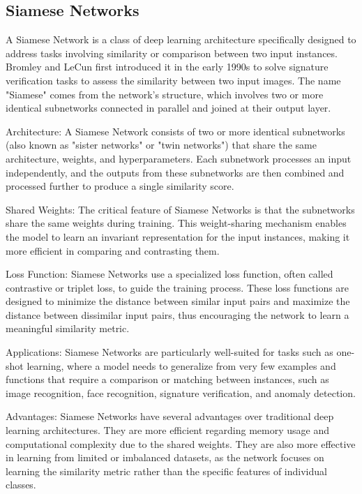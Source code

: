 \subsection{Siamese Networks}

A Siamese Network is a class of deep learning architecture specifically designed to address tasks involving similarity or comparison between two input instances. Bromley and LeCun first introduced it in the early 1990s to solve signature verification tasks to assess the similarity between two input images. The name "Siamese" comes from the network's structure, which involves two or more identical subnetworks connected in parallel and joined at their output layer.

Architecture: A Siamese Network consists of two or more identical subnetworks (also known as "sister networks" or "twin networks") that share the same architecture, weights, and hyperparameters. Each subnetwork processes an input independently, and the outputs from these subnetworks are then combined and processed further to produce a single similarity score.

Shared Weights: The critical feature of Siamese Networks is that the subnetworks share the same weights during training. This weight-sharing mechanism enables the model to learn an invariant representation for the input instances, making it more efficient in comparing and contrasting them.

Loss Function: Siamese Networks use a specialized loss function, often called contrastive or triplet loss, to guide the training process. These loss functions are designed to minimize the distance between similar input pairs and maximize the distance between dissimilar input pairs, thus encouraging the network to learn a meaningful similarity metric.

Applications: Siamese Networks are particularly well-suited for tasks such as one-shot learning, where a model needs to generalize from very few examples and functions that require a comparison or matching between instances, such as image recognition, face recognition, signature verification, and anomaly detection.

Advantages: Siamese Networks have several advantages over traditional deep learning architectures. They are more efficient regarding memory usage and computational complexity due to the shared weights. They are also more effective in learning from limited or imbalanced datasets, as the network focuses on learning the similarity metric rather than the specific features of individual classes.

